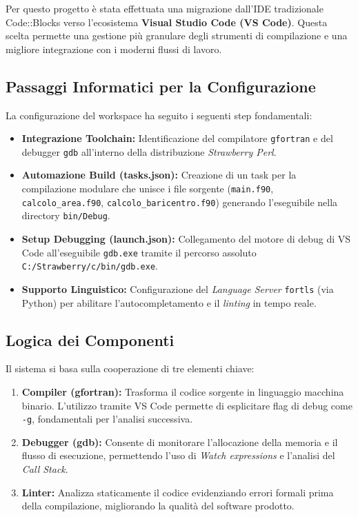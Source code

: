 Per questo progetto è stata effettuata una migrazione dall'IDE tradizionale Code::Blocks verso l'ecosistema \textbf{Visual Studio Code (VS Code)}. Questa scelta permette una gestione più granulare degli strumenti di compilazione e una migliore integrazione con i moderni flussi di lavoro.

\subsection{Passaggi Informatici per la Configurazione}
La configurazione del workspace ha seguito i seguenti step fondamentali:
\begin{itemize}
    \item \textbf{Integrazione Toolchain:} Identificazione del compilatore \texttt{gfortran} e del debugger \texttt{gdb} all'interno della distribuzione \textit{Strawberry Perl}.
    \item \textbf{Automazione Build (tasks.json):} Creazione di un task per la compilazione modulare che unisce i file sorgente (\texttt{main.f90}, \texttt{calcolo\_area.f90}, \texttt{calcolo\_baricentro.f90}) generando l'eseguibile nella directory \texttt{bin/Debug}.
    \item \textbf{Setup Debugging (launch.json):} Collegamento del motore di debug di VS Code all'eseguibile \texttt{gdb.exe} tramite il percorso assoluto \texttt{C:/Strawberry/c/bin/gdb.exe}.
    \item \textbf{Supporto Linguistico:} Configurazione del \textit{Language Server} \texttt{fortls} (via Python) per abilitare l'autocompletamento e il \textit{linting} in tempo reale.
\end{itemize}

\subsection{Logica dei Componenti}
Il sistema si basa sulla cooperazione di tre elementi chiave:
\begin{enumerate}
    \item \textbf{Compiler (gfortran):} Trasforma il codice sorgente in linguaggio macchina binario. L'utilizzo tramite VS Code permette di esplicitare flag di debug come \texttt{-g}, fondamentali per l'analisi successiva.
    \item \textbf{Debugger (gdb):} Consente di monitorare l'allocazione della memoria e il flusso di esecuzione, permettendo l'uso di \textit{Watch expressions} e l'analisi del \textit{Call Stack}.
    \item \textbf{Linter:} Analizza staticamente il codice evidenziando errori formali prima della compilazione, migliorando la qualità del software prodotto.
\end{enumerate}

